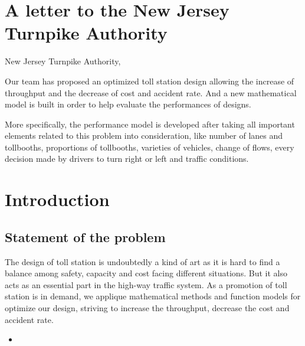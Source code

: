 \documentclass{mcmthesis}
\begin{document}
\section{A letter to the New Jersey Turnpike Authority}


New Jersey Turnpike Authority,

Our team has proposed an optimized toll station design allowing the increase of throughput and the decrease of cost and accident rate. And a new mathematical model is built in order to help evaluate the performances of designs. 

More specifically, the performance model is developed after taking all important elements related to this problem into consideration, like number of lanes and tollbooths, proportions of tollbooths, varieties of vehicles, change of flows, every decision made by drivers to turn right or left and traffic conditions. 



\section{Introduction}

\subsection{Statement of the problem}

  The design of toll station is undoubtedly a kind of art as it is hard to find a balance among safety, capacity and cost facing different situations. But it also acts as an essential part in the high-way traffic system. As a promotion of toll station is in demand, we applique mathematical methods and function models for optimize our design, striving to increase the throughput, decrease the cost and accident rate.


\begin{itemize}

\item 
\end{itemize}







\begin{Theorem} \label{thm:latex}

\end{Theorem}

\begin{Lemma} \label{thm:tex}

\end{Lemma}
\end{document}

